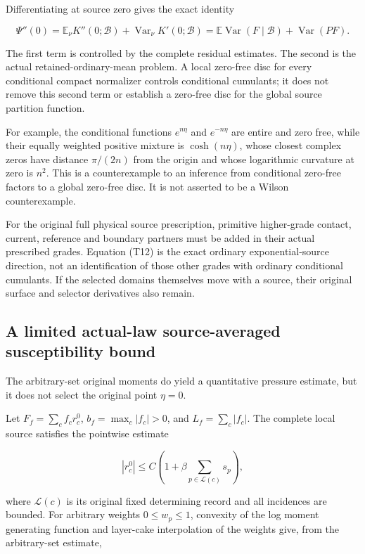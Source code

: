 \documentclass[
  11pt,
]{article}
\begin{document}
Differentiating at source zero gives the exact identity

\[
 \boxed{
 \Psi''(0)
 =\mathbb E_\nu K''(0;\mathcal B)
   +\operatorname{Var}_\nu K'(0;\mathcal B)
 =\mathbb E\operatorname{Var}(F\mid\mathcal B)
   +\operatorname{Var}(PF).}
 \tag{T12}
\]

The first term is controlled by the complete residual estimates. The
second is the actual retained-ordinary-mean problem. A local zero-free
disc for every conditional compact normalizer controls conditional
cumulants; it does not remove this second term or establish a zero-free
disc for the global source partition function.

For example, the conditional functions \(e^{n\eta}\) and \(e^{-n\eta}\)
are entire and zero free, while their equally weighted positive mixture
is \(\cosh(n\eta)\), whose closest complex zeros have distance
\(\pi/(2n)\) from the origin and whose logarithmic curvature at zero is
\(n^2\). This is a counterexample to an inference from conditional
zero-free factors to a global zero-free disc. It is not asserted to be a
Wilson counterexample.

For the original full physical source prescription, primitive
higher-grade contact, current, reference and boundary partners must be
added in their actual prescribed grades. Equation (T12) is the exact
ordinary exponential-source direction, not an identification of those
other grades with ordinary conditional cumulants. If the selected
domains themselves move with a source, their original surface and
selector derivatives also remain.

\hypertarget{a-limited-actual-law-source-averaged-susceptibility-bound}{%
\subsection{A limited actual-law source-averaged susceptibility
bound}\label{a-limited-actual-law-source-averaged-susceptibility-bound}}

The arbitrary-set original moments do yield a quantitative pressure
estimate, but it does not select the original point \(\eta=0\).

Let \(F_f=\sum_cf_cr_c^0\), \(b_f=\max_c|f_c|>0\), and
\(L_f=\sum_c|f_c|\). The complete local source satisfies the pointwise
estimate

\[
 |r_c^0|\le C\left(1+\beta\sum_{p\in\mathcal L(c)}s_p\right),
 \tag{T13}
\]

where \(\mathcal L(c)\) is its original fixed determining record and all
incidences are bounded. For arbitrary weights \(0\le w_p\le1\),
convexity of the log moment generating function and layer-cake
interpolation of the weights give, from the arbitrary-set estimate,
\end{document}
